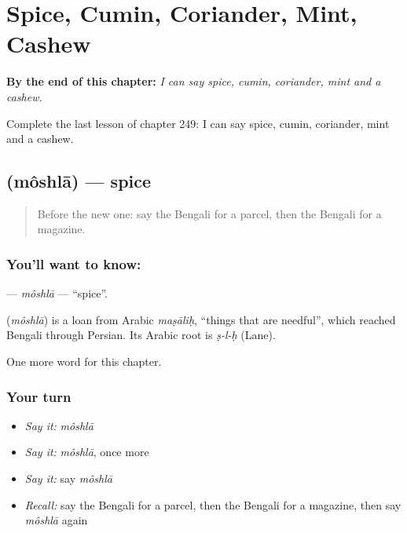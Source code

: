 
\chapter{Spice, Cumin, Coriander, Mint, Cashew}
\label{ch:bn-spice-cumin-coriander-mint-cashew}

\begin{chapteropening}
\textbf{By the end of this chapter:} \emph{I can say spice, cumin, coriander, mint and a cashew.}

Complete the last lesson of chapter 249: I can say spice, cumin, coriander, mint and a cashew.
\end{chapteropening}

\section[\texorpdfstring{\bn{মশলা} (môshlā)}{মশলা (môshlā)}]{ (môshlā) — spice}

\label{lesson:BN-C249-moshla}



\begin{quote}
Before the new one: say the Bengali for a parcel, then the Bengali for a magazine.
\end{quote}

\subsection*{You'll want to know: }
\textbf{} — \emph{môshlā} — \textquotedblleft{}spice\textquotedblright{}.

\begin{cousinweb}
\textbf{} (\emph{môshlā}) is a loan from Arabic \emph{maṣāliḥ}, \textquotedblleft{}things that are needful\textquotedblright{}, which reached Bengali through Persian. Its Arabic root is \emph{ṣ-l-ḥ} (Lane).
\end{cousinweb}

\begin{grammarlens}[title={What you've built}]
One more word for this chapter.
\end{grammarlens}

\subsection*{Your turn}
\begin{itemize}
\raggedright
  \item \emph{Say it:} \emph{môshlā}
  \item \emph{Say it:} \emph{môshlā}, once more
  \item \emph{Say it:} say \emph{môshlā}
  \item \emph{Recall:} say the Bengali for a parcel, then the Bengali for a magazine, then say \emph{môshlā} again
\end{itemize}


